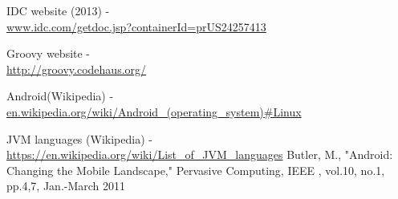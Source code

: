 \documentclass{sigplanconf}
\def \ANDROID{\mbox{Android}\xspace}
\def \JVM{JVM\xspace}
\begin{document}




\begin{thebibliography}{}
  \softraggedright

  IDC website (2013) - \\ \url{www.idc.com/getdoc.jsp?containerId=prUS24257413}

  Groovy website - \\ \url{http://groovy.codehaus.org/}
  
  \ANDROID (Wikipedia) - \\ \url{en.wikipedia.org/wiki/Android\_(operating\_system)#Linux}

  \JVM languages (Wikipedia) - \\ \url{https://en.wikipedia.org/wiki/List\_of\_JVM\_languages}
   Butler, M., "Android: Changing the Mobile Landscape," Pervasive Computing, IEEE , vol.10, no.1, pp.4,7, Jan.-March 2011


\end{thebibliography}
\end{document}
